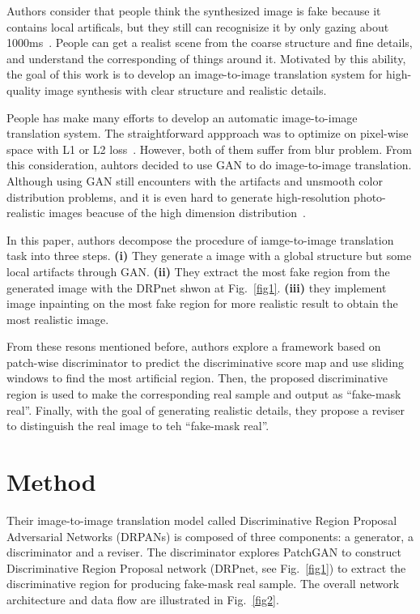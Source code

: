 \documentclass[10pt,twocolumn,letterpaper]{article}
\begin{document}
Authors consider that people think the synthesized image is fake because it contains local artificals, but they still can recognisize it by only gazing about 1000ms~\cite{Photographic}. People can get a realist scene from the coarse structure and fine details, and understand the corresponding of things around it. Motivated by this ability, the goal of this work is to develop an image-to-image translation system for high-quality image synthesis with clear structure and realistic details.

People has make many efforts to develop an automatic image-to-image translation system. The straightforward appproach was to optimize on pixel-wise space with L1 or L2 loss~\cite{Image,Fully}. However, both of them suffer from blur problem. From this consideration, auhtors decided to use GAN to do image-to-image translation. Although using GAN still encounters with the artifacts and unsmooth color distribution problems, and it is even hard to generate high-resolution photo-realistic images beacuse of the high dimension distribution~\cite{Conditional}.

In this paper, authors decompose the procedure of iamge-to-image translation task into three steps. {\bf (i)} They generate a image with a global structure but some local artifacts through GAN. {\bf (ii)} They extract the most fake region from the generated image with the DRPnet shwon at Fig.~\ref{fig1}. {\bf (iii)} they implement image inpainting on the most fake region for more realistic result to obtain the most realistic image.

From these resons mentioned before, authors explore a framework based on patch-wise discriminator to predict the discriminative score map and use sliding windows to find the most artificial region. Then, the proposed discriminative region is used to make the corresponding real sample and output as ``fake-mask real''. Finally, with the goal of generating realistic details, they propose a reviser to distinguish the real image to teh ``fake-mask real''. 

\section{Method}

Their image-to-image translation model called Discriminative Region Proposal Adversarial Networks (DRPANs) is composed of three components: a generator, a discriminator and a reviser. The discriminator explores PatchGAN to construct Discriminative Region Proposal network (DRPnet, see Fig.~\ref{fig1}) to extract the discriminative region for producing fake-mask real sample. The overall network architecture and data flow are illustrated in Fig.~\ref{fig2}.
\end{document}
